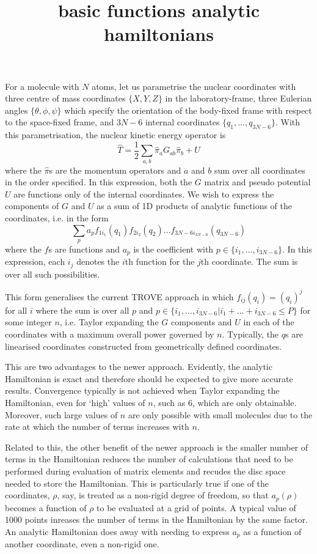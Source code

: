 \documentclass{article}
\title{basic functions analytic hamiltonians}
\begin{document}
For a molecule with $N$ atoms, let us parametrise the nuclear coordinates with three centre of mass coordinates $\{X,Y,Z\}$ in the laboratory-frame, three Eulerian angles $\{\theta, \phi, \psi\}$ which specify the orientation of the body-fixed frame with respect to the space-fixed frame, and $3N-6$ internal coordinates $\{q_1, \ldots, q_{3N-6}\}$. With this parametrisation, the nuclear kinetic energy operator is  
\[
\hat{T}= \dfrac12 \sum_{a,b}\hat{\pi}_a G_{ab}\hat{\pi}_b + U
\]
where the $\hat{\pi}$s are the momentum operators and $a$ and $b$ sum over all coordinates in the order specified. In this expression, both the $G$ matrix and pseudo potential $U$ are functions only of the internal coordinates. We wish to express the components of $G$ and $U$ as a sum of 1D products of analytic functions of the coordinates, i.e. in the form
\[
\sum_{p} a_p f_{1i_1}(q_1)f_{2i_2}(q_2)\ldots f_{3N-6 i_{3N-6}}(q_{3N-6})
\]
where the $f$s are functions and $a_p$ is the coefficient with $p\in \{i_1, \ldots, i_{3N-6}\}$. In this expression, each $i_j$ denotes the $i$th function for the $j$th coordinate. The sum is over all such possibilities. 

This form generalises the current TROVE approach in which $f_{ij}(q_i) = (q_i)^j$ for all $i$ where the sum is over all $p$ and $p \in \{ i_1, \dots, i_{3N-6} | i_1 + \ldots + i_{3N-6} \leq P\}$ for some integer $n$, i.e. Taylor expanding the $G$ components and $U$ in each of the coordinates with a maximum overall power governed by $n$. Typically, the $q$s are linearised coordinates constructed from geometrically defined coordinates. 

This are two advantages to the newer approach. Evidently, the analytic Hamiltonian is exact and therefore should be expected to give more accurate results. Convergence typically is not achieved when Taylor expanding the Hamiltonian, even for `high' values of $n$, such as 6, which are only obtainable. Moreover, such large values of $n$ are only possible with small molecules due to the rate at which the number of terms increases with $n$. 

Related to this, the other benefit of the newer approach is the smaller number of terms in the Hamiltonian reduces the number of calculations that need to be performed during evaluation of matrix elements and recudes the disc space needed to store the Hamiltonian. This is particularly true if one of the coordinates, $\rho$, say, is treated as a non-rigid degree of freedom, so that $a_p(\rho)$ becomes a function of $\rho$ to be evaluated at a grid of points. A typical value of 1000 points inreases the number of terms in the Hamiltonian by the same factor. An analytic Hamiltonian does away with needing to express $a_p$ as a function of another coordinate, even a non-rigid one. 
\end{document}
